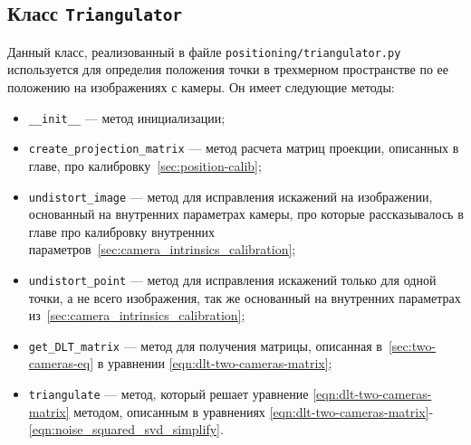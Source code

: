 \documentclass[12pt, a4paper]{article}
\begin{document}
\subsection{Класс \texttt{Triangulator}}
Данный класс, реализованный в файле \texttt{positioning/triangulator.py}
используется для определия положения точки в трехмерном пространстве по ее
положению на изображениях с камеры. Он имеет следующие методы:
\begin{itemize}
  \item \texttt{\_\_init\_\_} --- метод инициализации;
  \item \texttt{create\_projection\_matrix} --- метод расчета матриц проекции,
    описанных в главе, про калибровку~\ref{sec:position-calib};
  \item \texttt{undistort\_image} --- метод для исправления искажений на
    изображении, основанный на внутренних параметрах камеры, про которые
    рассказывалось в главе про калибровку внутренних параметров~\ref{sec:camera_intrinsics_calibration};
  \item \texttt{undistort\_point} --- метод для исправления искажений только
    для одной точки, а не всего изображения, так же основанный на внутренних
    параметрах из~\ref{sec:camera_intrinsics_calibration};
  \item \texttt{get\_DLT\_matrix} --- метод для получения матрицы, описанная
    в~\ref{sec:two-cameras-eq} в уравнении \eqref{eqn:dlt-two-cameras-matrix};
  \item \texttt{triangulate} --- метод, который решает уравнение
    \eqref{eqn:dlt-two-cameras-matrix} методом, описанным в уравнениях
    \eqref{eqn:dlt-two-cameras-matrix}-\eqref{eqn:noise_squared_svd_simplify}.
\end{itemize}
\end{document}

